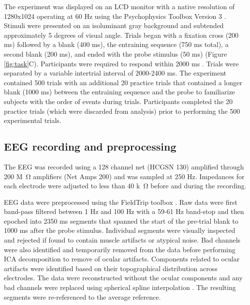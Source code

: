 \documentclass[../dwyatte_dissertation.tex]{subfiles}
\begin{document}
The experiment was displayed on an LCD monitor with a native resolution of 1280x1024 operating at 60 Hz using the Psychophysics Toolbox Version 3 \cite{Brainard97,Pelli97}. Stimuli were presented on an isoluminant gray background and subtended approximately 5 degrees of visual angle. Trials began with a fixation cross (200 ms) followed by a blank (400 ms), the entraining sequence (750 ms total), a second blank (200 ms), and ended with the probe stimulus (50 ms) (Figure \ref{fig:task}C). Participants were required to respond within 2000 ms . Trials were separated by a variable intertrial interval of 2000-2400 ms. The experiment contained 500 trials with an additional 20 practice trials that contained a longer blank (1000 ms) between the entraining sequence and the probe to familiarize subjects with the order of events during trials. Participants completed the 20 practice trials (which were discarded from analysis) prior to performing the 500 experimental trials. %

\subsection{EEG recording and preprocessing}
The EEG was recorded using a 128 channel net (HCGSN 130) amplified through 200 M\SI{}{\ohm} amplifiers (Net Amps 200) and was sampled at 250 Hz. Impedances for each electrode were adjusted to less than 40 k\SI{}{\ohm} before and during the recording.


EEG data were preprocessed using the FieldTrip toolbox \cite{OostenveldFriesMarisEtAl11}. Raw data were first band-pass filtered between 1 Hz and 100 Hz with a 59-61 Hz band-stop and then epoched into 2350 ms segments that spanned the start of the pre-trial blank to 1000 ms after the probe stimulus. Individual segments were visually inspected and rejected if found to contain muscle artifacts or atypical noise. Bad channels were also identified and temporarily removed from the data before performing ICA decomposition \cite{DelormeMakeig04} to remove of ocular artifacts. Components related to ocular artifacts were identified based on their topographical distribution across electrodes. The data were reconstructed without the ocular components and any bad channels were replaced using spherical spline interpolation \cite{PerrinPernierBertrandEtAl89}. The resulting segments were re-referenced to the average reference.
\end{document}
